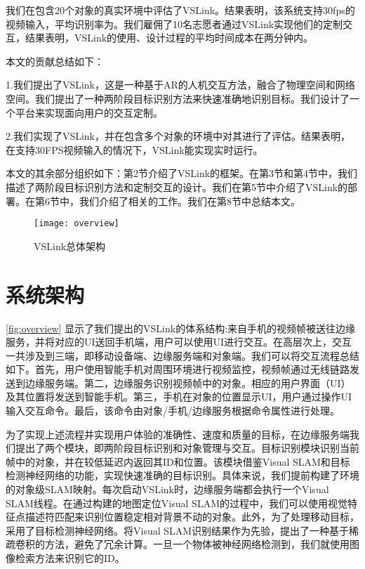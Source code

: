 我们在包含20个对象的真实环境中评估了VSLink。结果表明，该系统支持30fps的视频输入，平均识别率为{\acc}。我们雇佣了10名志愿者通过VSLink实现他们的定制交互，结果表明，VSLink的使用、设计过程的平均时间成本在两分钟内。

本文的贡献总结如下：

1.我们提出了VSLink，这是一种基于AR的人机交互方法，融合了物理空间和网络空间。我们提出了一种两阶段目标识别方法来快速准确地识别目标。我们设计了一个平台来实现面向用户的交互定制。

2.我们实现了VSLink，并在包含多个对象的环境中对其进行了评估。结果表明，在支持30FPS视频输入的情况下，VSLink能实现实时运行。

本文的其余部分组织如下：第2节介绍了VSLink的框架。在第3节和第4节中，我们描述了两阶段目标识别方法和定制交互的设计。我们在第5节中介绍了VSLink的部署。在第6节中，我们介绍了相关的工作。我们在第8节中总结本文。

\begin{figure}[t]
	\centering
	\texttt{[image: overview]}
	\caption{VSLink总体架构}
	\label{fig:overview}
\end{figure}

\chapter{系统架构}\label{sec:architec}


\autoref{fig:overview} 显示了我们提出的VSLink的体系结构:来自手机的视频帧被送往边缘服务，并将对应的UI送回手机端，用户可以使用UI进行交互。在高层次上，交互一共涉及到三端，即移动设备端、边缘服务端和对象端。我们可以将交互流程总结如下。首先，用户使用智能手机对周围环境进行视频监控，视频帧通过无线链路发送到边缘服务端。第二，边缘服务识别视频帧中的对象。相应的用户界面（UI）及其位置将发送到智能手机。第三，手机在对象的位置显示UI，用户通过操作UI输入交互命令。最后，该命令由对象/手机/边缘服务根据命令属性进行处理。

为了实现上述流程并实现用户体验的准确性、速度和质量的目标，在边缘服务端我们提出了两个模块，即两阶段目标识别和对象管理与交互。目标识别模块识别当前帧中的对象，并在较低延迟内返回其ID和位置。该模块借鉴Visual SLAM和目标检测神经网络的功能，实现快速准确的目标识别。具体来说，我们提前构建了环境的对象级SLAM映射。每次启动VSLink时，边缘服务端都会执行一个Visual SLAM线程。在通过构建的地图定位Visual SLAM的过程中，我们可以使用视觉特征点描述符匹配来识别位置稳定相对背景不动的对象。此外，为了处理移动目标，采用了目标检测神经网络。将Visual SLAM识别结果作为先验，提出了一种基于稀疏卷积的方法，避免了冗余计算。一旦一个物体被神经网络检测到，我们就使用图像检索方法来识别它的ID。

